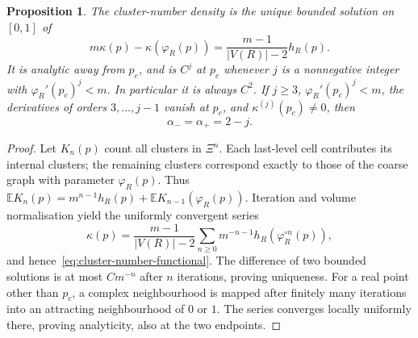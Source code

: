 \documentclass[scheme=plain,11pt]{ctexart}
\newtheorem{proposition}[theorem]{Proposition}
\theoremstyle{definition}
\theoremstyle{remark}
\begin{document}
\begin{proposition}\label{prop:cluster-number-response}
The cluster-number density is the unique bounded solution on $[0,1]$ of
\begin{equation}\label{eq:cluster-number-functional}
 m\kappa(p)-\kappa(\varphi_R(p))
 =\frac{m-1}{|V(R)|-2}h_R(p).
\end{equation}
It is analytic away from $p_c$, and is $C^j$ at $p_c$ whenever $j$ is a nonnegative integer with $\varphi_R'(p_c)^j<m$.
In particular it is always $C^2$.
If $j\ge3$, $\varphi_R'(p_c)^j<m$, the derivatives of orders $3,\ldots,j-1$ vanish at $p_c$, and $\kappa^{(j)}(p_c)\ne0$, then
\[
 \alpha_- =\alpha_+=2-j.
\]
\end{proposition}
\begin{proof}
Let $K_n(p)$ count all clusters in $\Xi^n$.
Each last-level cell contributes its internal clusters; the remaining clusters correspond exactly to those of the coarse graph with parameter $\varphi_R(p)$.
Thus $\mathbb E K_n(p)=m^{n-1}h_R(p)+\mathbb E K_{n-1}(\varphi_R(p))$.
Iteration and volume normalisation yield the uniformly convergent series
\begin{equation}\label{eq:cluster-number-series}
 \kappa(p)=\frac{m-1}{|V(R)|-2}
 \sum_{n\ge0}m^{-n-1}h_R(\varphi_R^{\circ n}(p)),
\end{equation}
and hence~\eqref{eq:cluster-number-functional}.
The difference of two bounded solutions is at most $Cm^{-n}$ after $n$ iterations, proving uniqueness.
For a real point other than $p_c$, a complex neighbourhood is mapped after finitely many iterations into an attracting neighbourhood of $0$ or $1$.
The series converges locally uniformly there, proving analyticity, also at the two endpoints.


\end{proof}
\end{document}
